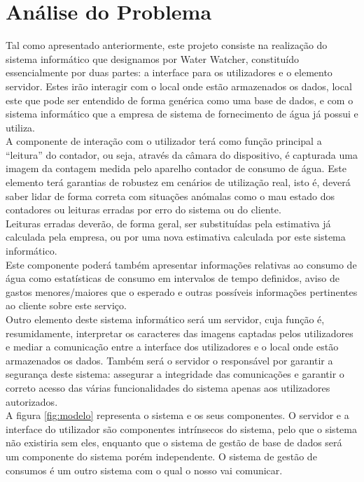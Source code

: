 \chapter{Análise do Problema} \label{cap:analise}

Tal como apresentado anteriormente, este projeto consiste na realização do sistema informático que designamos por Water Watcher, constituído essencialmente por duas partes: a interface para os utilizadores e o elemento servidor. Estes irão interagir com o local onde estão armazenados os dados, local este que pode ser entendido de forma genérica como uma base de dados, e com o sistema informático que a empresa de sistema de fornecimento de água já possui e utiliza.\\
A componente de interação com o utilizador terá como função principal a “leitura” do contador, ou seja, através da câmara do dispositivo, é capturada uma imagem da contagem medida pelo aparelho contador de consumo de água. Este elemento terá garantias de robustez em cenários de utilização real, isto é, deverá saber lidar de forma correta com situações anómalas como o mau estado dos contadores ou leituras erradas por erro do sistema ou do cliente.\\
Leituras erradas deverão, de forma geral, ser substituídas pela estimativa já calculada pela empresa, ou por uma nova estimativa calculada por este sistema informático.\\
Este componente poderá também apresentar informações relativas ao consumo de água como estatísticas de consumo em intervalos de tempo definidos, aviso de gastos menores/maiores que o esperado e outras possíveis informações pertinentes ao cliente sobre este serviço.\\
Outro elemento deste sistema informático será um servidor, cuja função é, resumidamente, interpretar os caracteres das imagens captadas pelos utilizadores e mediar a comunicação entre a interface dos utilizadores e o local onde estão armazenados os dados. Também será o servidor o responsável por garantir a segurança deste sistema: assegurar a integridade das comunicações e garantir o correto acesso das várias funcionalidades do sistema apenas aos utilizadores autorizados.\\
A figura \ref{fig:modelo} representa o sistema e os seus componentes. O servidor e a interface do utilizador são componentes intrínsecos do sistema, pelo que o sistema não existiria sem eles, enquanto que o sistema de gestão de base de dados será um componente do sistema porém independente. O sistema de gestão de consumos é um outro sistema com o qual o nosso vai comunicar.

